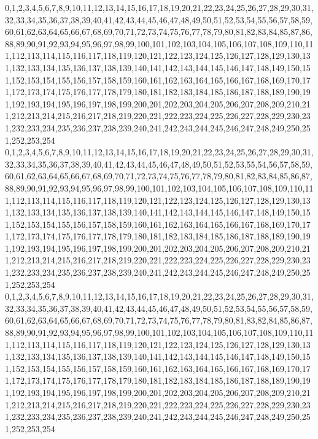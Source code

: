 \documentclass[12pt]{article}
\begin{document}
{0,1,2,3,4,5,6,7,8,9,10,11,12,13,14,15,16,17,18,19,20,21,22,23,24,25,26,27,28,29,30,31,32,33,34,35,36,37,38,39,40,41,42,43,44,45,46,47,48,49,50,51,52,53,54,55,56,57,58,59,60,61,62,63,64,65,66,67,68,69,70,71,72,73,74,75,76,77,78,79,80,81,82,83,84,85,87,86,88,89,90,91,92,93,94,95,96,97,98,99,100,101,102,103,104,105,106,107,108,109,110,111,112,113,114,115,116,117,118,119,120,121,122,123,124,125,126,127,128,129,130,131,132,133,134,135,136,137,138,139,140,141,142,143,144,145,146,147,148,149,150,151,152,153,154,155,156,157,158,159,160,161,162,163,164,165,166,167,168,169,170,171,172,173,174,175,176,177,178,179,180,181,182,183,184,185,186,187,188,189,190,191,192,193,194,195,196,197,198,199,200,201,202,203,204,205,206,207,208,209,210,211,212,213,214,215,216,217,218,219,220,221,222,223,224,225,226,227,228,229,230,231,232,233,234,235,236,237,238,239,240,241,242,243,244,245,246,247,248,249,250,251,252,253,254\\
0,1,2,3,4,5,6,7,8,9,10,11,12,13,14,15,16,17,18,19,20,21,22,23,24,25,26,27,28,29,30,31,32,33,34,35,36,37,38,39,40,41,42,43,44,45,46,47,48,49,50,51,52,53,55,54,56,57,58,59,60,61,62,63,64,65,66,67,68,69,70,71,72,73,74,75,76,77,78,79,80,81,82,83,84,85,86,87,88,89,90,91,92,93,94,95,96,97,98,99,100,101,102,103,104,105,106,107,108,109,110,111,112,113,114,115,116,117,118,119,120,121,122,123,124,125,126,127,128,129,130,131,132,133,134,135,136,137,138,139,140,141,142,143,144,145,146,147,148,149,150,151,152,153,154,155,156,157,158,159,160,161,162,163,164,165,166,167,168,169,170,171,172,173,174,175,176,177,178,179,180,181,182,183,184,185,186,187,188,189,190,191,192,193,194,195,196,197,198,199,200,201,202,203,204,205,206,207,208,209,210,211,212,213,214,215,216,217,218,219,220,221,222,223,224,225,226,227,228,229,230,231,232,233,234,235,236,237,238,239,240,241,242,243,244,245,246,247,248,249,250,251,252,253,254\\
0,1,2,3,4,5,6,7,8,9,10,11,12,13,14,15,16,17,18,19,20,21,22,23,24,25,26,27,28,29,30,31,32,33,34,35,36,37,38,39,40,41,42,43,44,45,46,47,48,49,50,51,52,53,54,55,56,57,58,59,60,61,62,63,64,65,66,67,68,69,70,71,72,73,74,75,76,77,78,79,80,81,83,82,84,85,86,87,88,89,90,91,92,93,94,95,96,97,98,99,100,101,102,103,104,105,106,107,108,109,110,111,112,113,114,115,116,117,118,119,120,121,122,123,124,125,126,127,128,129,130,131,132,133,134,135,136,137,138,139,140,141,142,143,144,145,146,147,148,149,150,151,152,153,154,155,156,157,158,159,160,161,162,163,164,165,166,167,168,169,170,171,172,173,174,175,176,177,178,179,180,181,182,183,184,185,186,187,188,189,190,191,192,193,194,195,196,197,198,199,200,201,202,203,204,205,206,207,208,209,210,211,212,213,214,215,216,217,218,219,220,221,222,223,224,225,226,227,228,229,230,231,232,233,234,235,236,237,238,239,240,241,242,243,244,245,246,247,248,249,250,251,252,253,254\\
}
\end{document}
